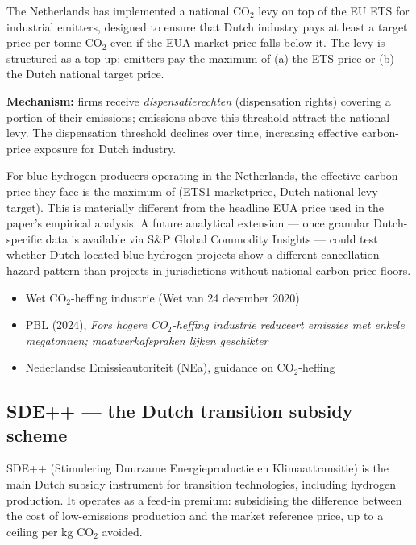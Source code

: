 \documentclass[11pt,a4paper]{article}
\begin{document}
The Netherlands has implemented a national CO$_2$ levy on top of the EU ETS for industrial emitters, designed to ensure that Dutch industry pays at least a target price per tonne CO$_2$ even if the EUA market price falls below it. The levy is structured as a top-up: emitters pay the maximum of (a) the ETS price or (b) the Dutch national target price.

\textbf{Mechanism:} firms receive \emph{dispensatierechten} (dispensation rights) covering a portion of their emissions; emissions above this threshold attract the national levy. The dispensation threshold declines over time, increasing effective carbon-price exposure for Dutch industry.

\begin{technote}
For blue hydrogen producers operating in the Netherlands, the effective carbon price they face is the maximum of (ETS1 marketprice, Dutch national levy target). This is materially different from the headline EUA price used in the paper's empirical analysis. A future analytical extension --- once granular Dutch-specific data is available via S\&P Global Commodity Insights --- could test whether Dutch-located blue hydrogen projects show a different cancellation hazard pattern than projects in jurisdictions without national carbon-price floors.
\end{technote}

\begin{keysources}
\begin{itemize}
  \item Wet CO$_2$-heffing industrie (Wet van 24 december 2020)
  \item PBL (2024), \emph{Fors hogere CO$_2$-heffing industrie reduceert emissies met enkele megatonnen; maatwerkafspraken lijken geschikter}
  \item Nederlandse Emissieautoriteit (NEa), guidance on CO$_2$-heffing
\end{itemize}
\end{keysources}

\subsection{SDE++ --- the Dutch transition subsidy scheme}

SDE++ (Stimulering Duurzame Energieproductie en Klimaattransitie) is the main Dutch subsidy instrument for transition technologies, including hydrogen production. It operates as a feed-in premium: subsidising the difference between the cost of low-emissions production and the market reference price, up to a ceiling per kg CO$_2$ avoided.
\end{document}

